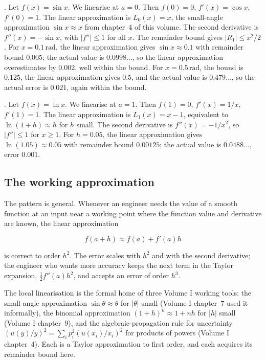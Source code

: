 . Let $f(x) = \sin x$. We linearise at
$a = 0$. Then $f(0) = 0$, $f'(x) = \cos x$, $f'(0) = 1$. The
linear approximation is $L_{0}(x) = x$, the small-angle
approximation $\sin x \approx x$ from chapter~4 of this volume.
The second derivative is $f''(x) = -\sin x$, with $|f''| \leq 1$
for all $x$. The remainder bound gives $|R_{1}| \leq x^{2}/2$.
For $x = 0.1\,\si{\radian}$, the linear approximation gives
$\sin x \approx 0.1$ with remainder bound $0.005$; the actual
value is $0.0998\ldots$, so the linear approximation overestimates
by $0.002$, well within the bound. For $x = 0.5\,\si{\radian}$,
the bound is $0.125$, the linear approximation gives $0.5$, and
the actual value is $0.479\ldots$, so the actual error is $0.021$,
again within the bound.

. Let $f(x) = \ln x$. We linearise at
$a = 1$. Then $f(1) = 0$, $f'(x) = 1/x$, $f'(1) = 1$. The linear
approximation is $L_{1}(x) = x - 1$, equivalent to $\ln(1 + h)
\approx h$ for $h$ small. The second derivative is $f''(x) =
-1/x^{2}$, so $|f''| \leq 1$ for $x \geq 1$. For $h = 0.05$, the
linear approximation gives $\ln(1.05) \approx 0.05$ with remainder
bound $0.00125$; the actual value is $0.0488\ldots$, error $0.001$.

\subsection{The working approximation}

The pattern is general. Whenever an engineer needs the value of a
smooth function at an input near a working point where the
function value and derivative are known, the linear approximation

\[
f(a + h) \approx f(a) + f'(a) h
\]

is correct to order $h^{2}$. The error scales with $h^{2}$ and
with the second derivative; the engineer who wants more accuracy
keeps the next term in the Taylor expansion, $\tfrac{1}{2}
f''(a) h^{2}$, and accepts an error of order $h^{3}$.

The local linearisation is the formal home of three Volume I
working tools: the small-angle approximation $\sin\theta \approx
\theta$ for $|\theta|$ small (Volume I chapter~7 used it
informally), the binomial approximation $(1 + h)^{n} \approx 1 +
n h$ for $|h|$ small (Volume I chapter~9), and the
algebraic-propagation rule for uncertainty $(u(y)/y)^{2} =
\sum_{i} p_{i}^{2} (u(x_{i})/x_{i})^{2}$ for products of powers
(Volume I chapter~4). Each is a Taylor approximation to first
order, and each acquires its remainder bound here.

